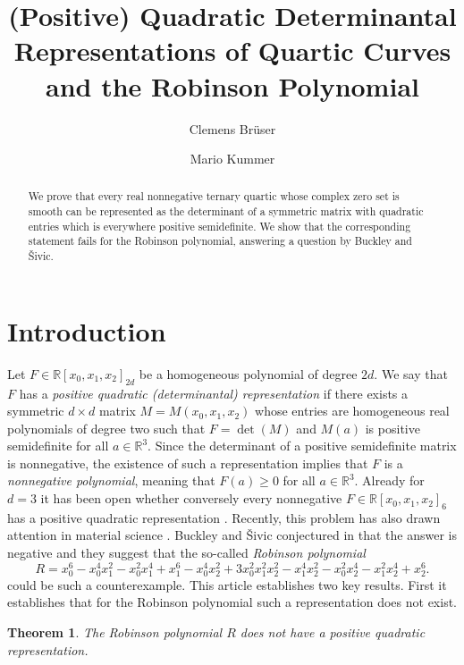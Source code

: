 \documentclass[a4paper,10pt]{amsart}
\title[Positive Quadratic Determinantal Representations]{(Positive) Quadratic Determinantal Representations of Quartic Curves and the Robinson Polynomial}
\author{Clemens Brüser}
\author{Mario Kummer}
\theoremstyle{definition}
\theoremstyle{plain}
\newtheorem{thm}[Def]{Theorem}
\newcommand{\R}{{\mathbb R}}
\begin{document}



\begin{abstract}
 We prove that every real nonnegative ternary quartic whose complex zero set is smooth can be represented as the determinant of a symmetric matrix with quadratic entries which is everywhere positive semidefinite. We show that the corresponding statement fails for the Robinson polynomial, answering a question by Buckley and {\v{S}}ivic.
\end{abstract}
\maketitle

\section{Introduction}

Let $F\in\R[x_0,x_1,x_2]_{2d}$ be a homogeneous polynomial of degree $2d$. We say that $F$ has a \emph{positive quadratic (determinantal) representation} if there exists a symmetric $d\times d$ matrix $M=M(x_0,x_1,x_2)$ whose entries are homogeneous real polynomials of degree two such that $F=\det(M)$ and $M(a)$ is positive semidefinite for all $a\in\R^3$. Since the determinant of a positive semidefinite matrix is nonnegative, the existence of such a representation implies that $F$ is a \emph{nonnegative polynomial}, meaning that $F(a)\geq0$ for all $a\in\R^3$. Already for $d=3$ it has been open whether conversely every nonnegative $F\in\R[x_0,x_1,x_2]_{6}$ has a positive quadratic representation \cite[\S7]{quarez}. Recently, this problem has also drawn attention in material science \cite[p.~7]{harhov}. Buckley and {\v{S}}ivic conjectured in \cite{buckleysivic} that the answer is negative and they suggest that the so-called \emph{Robinson polynomial}
\begin{equation*}
 R=x_0^6-x_0^4 x_1^2-x_0^2 x_1^4+x_1^6-x_0^4 x_2^2+3 x_0^2 x_1^2 x_2^2-x_1^4 x_2^2-x_0^2 x_2^4-x_1^2 x_2^4+x_2^6.
\end{equation*}
could be such a counterexample. This article establishes two key results. First it establishes that for the Robinson polynomial such a representation does not exist.
\begin{thm}\label{thm:rob}
 The Robinson polynomial $R$ does not have a positive quadratic representation.
\end{thm}
\end{document}
